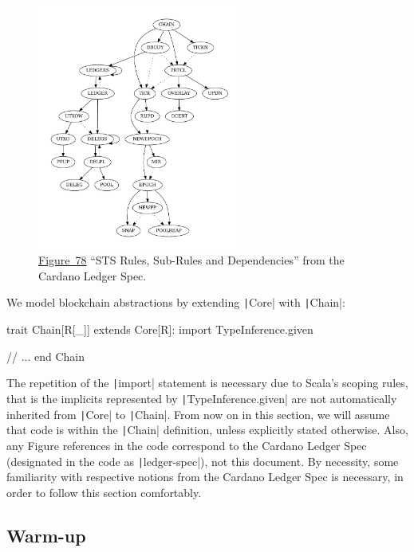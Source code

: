 \documentclass[11pt]{article}
\newcommand{\ScalaI}[1]{\texttt|#1|}
\newcommand{\TextI}[1]{\texttt|#1|}
\begin{document}
\begin{figure}[tb]
\centering
\includegraphics[width=0.6\textwidth]{rules}
\caption{\href{https://hydra.iohk.io/build/18363060/download/1/ledger-spec.pdf\#figure.78}{Figure~78} ``STS Rules, Sub-Rules and Dependencies'' from the Cardano Ledger Spec.}
\label{fig:ledger:spec:78}
\end{figure}

We model blockchain abstractions by extending \ScalaI{Core} with \ScalaI{Chain}:

\begin{ScalaBlockSimple}
trait Chain[R[_]] extends Core[R]:
  import TypeInference.given
  
  // ...
end Chain
\end{ScalaBlockSimple}

\noindent The repetition of the \ScalaI{import} statement is necessary due to Scala's scoping rules, that is the implicits represented by \ScalaI{TypeInference.given} are not automatically inherited from \ScalaI{Core} to \ScalaI{Chain}. From now on in this section, we will assume that code is within the \ScalaI{Chain} definition, unless explicitly stated otherwise. Also, any Figure references in the code correspond to the Cardano Ledger Spec (designated in the code as \TextI{ledger-spec}), not this document. By necessity, some familiarity with respective notions from the Cardano Ledger Spec is necessary, in order to follow this section comfortably.

\subsection{Warm-up}
\label{sec:chain:warmup}
\end{document}
